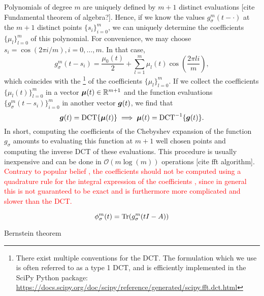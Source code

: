 Polynomials of degree $m$ are uniquely defined by $m+1$ distinct evaluations [cite Fundamental theorem of algebra?].
Hence, if we know the values $g_{\sigma}^m(t - \cdot)$ at the $m+1$ distinct points 
$\{s_i\}_{i=0}^m$, we can uniquely determine the coefficients $\{\mu_l\}_{l=0}^m$
of this polynomial. For convenience, we may choose $s_i = \cos(2 \pi i/m), i=0,\dots,m$.
In that case,
\begin{equation}
    g_{\sigma}^m(t - s_i) = \frac{\mu_0(t)}{2} + \sum_{l=1}^{m} \mu_l(t) \cos\left(\frac{2 \pi l i}{m}\right),
    \label{equ:2-chebyshev-chebyshev-nodes-evaluation}
\end{equation}
which coincides with the \footnote{There exist multiple conventions for the DCT.
The formulation which we use is often referred to as a type 1 DCT,
and is efficiently implemented in the SciPy Python package:
\url{https://docs.scipy.org/doc/scipy/reference/generated/scipy.fft.dct.html}} of the coefficients $\{\mu_l\}_{l=0}^m$.
If we collect the coefficients $\{\mu_l(t)\}_{l=0}^{m}$ in a vector $\boldsymbol{\mu}(t) \in \mathbb{R}^{m+1}$ 
and the function evaluations $\{g_{\sigma}^m(t - s_i)\}_{i=0}^{m}$ in another
vector $\boldsymbol{g}(t)$, we find that
\begin{equation}
    \boldsymbol{g}(t) = \operatorname{DCT} \{ \boldsymbol{\mu}(t) \} \implies \boldsymbol{\mu}(t) = \operatorname{DCT}^{-1}\{ \boldsymbol{g}(t) \}.
    \label{equ:2-chebyshev-chebyshev-DCT}
\end{equation}
In short, computing the coefficients of the Chebyshev expansion 
of the function $g_{\sigma}$ amounts to evaluating this function at $m+1$ well
chosen points and computing the inverse \gls{DCT} of these evaluations. 
This procedure is usually inexpensive and can be done in $\mathcal{O}(m \log(m))$
operations [cite fft algorithm].
\textcolor{red}{Contrary to popular belief \cite[Algorithm~1]{lin2017randomized},
the coefficients should not be computed using a quadrature rule for the integral
expression of the coefficients \cite[Theorem~3.1]{trefethen2019chebyshev}, since
in general this is not guaranteed to be exact and is furthermore more complicated
and slower than the \gls{DCT}.}

\begin{equation}
    \phi_{\sigma}^m(t) = \operatorname{Tr}(g_{\sigma}^m(tI - A))
    \label{equ:2-chebyshev-DGC-spectral-density-chebyshev-expansion}
\end{equation}

Bernstein theorem \cite[Theorem~73]{meinardus1967approximation} 

